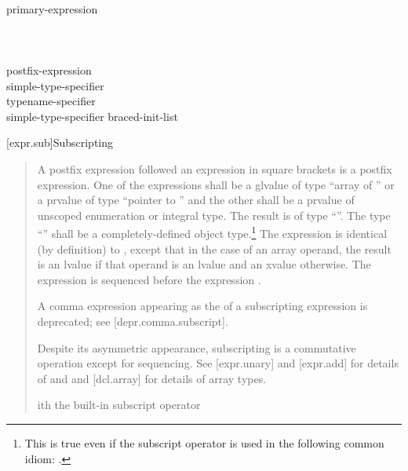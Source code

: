 \documentclass{wg21}
\begin{document}
\begin{bnf}
\\
primary-expression\\
\\
\\
\\
postfix-expression \terminal{(}  \terminal{)}\\
simple-type-specifier \terminal{(}  \terminal{)}\\
typename-specifier \terminal{(}  \terminal{)}\\
simple-type-specifier braced-init-list\\
\end{bnf}


[expr.sub]{Subscripting}
\begin{quote}
\pnum
{}%
%
A postfix expression followed an expression in square brackets is a
postfix expression. One of the expressions shall be a glvalue of type ``array of
'' or a prvalue of type ``pointer
to '' and the other shall be a prvalue of unscoped enumeration or integral type.
The result is of type ``''.
%
The type ``'' shall be a completely-defined object type.\footnote{This
    is true even if the subscript operator is used in the following common idiom:
    .}
The expression  is identical (by definition) to
,
except that in the case of an array operand, the result is an lvalue
if that operand is an lvalue and an xvalue otherwise.
The expression  is sequenced before the expression .

\pnum
\begin{removedblock}
\begin{note}
    A comma expression
    appearing as the 
    of a subscripting expression is deprecated;
    see [depr.comma.subscript].
\end{note}
\end{removedblock}

\pnum
\begin{note}
    Despite its asymmetric appearance, subscripting is a commutative
    operation except for sequencing.
    See [expr.unary] and [expr.add] for details of \tcode{*} and
    \tcode{+} and [dcl.array] for details of array types.
\end{note}

\pnum
{}ith the built-in subscript operator

\end{quote}
\end{document}

